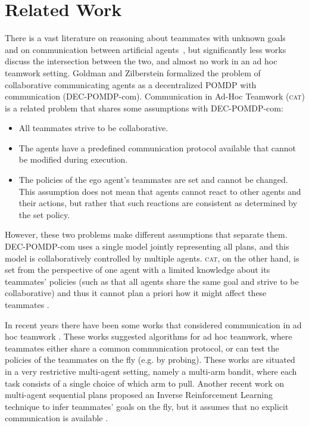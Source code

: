 \documentclass[letterpaper]{article}
\begin{document}
\section{Related Work}
There is a vast literature on reasoning about teammates with unknown goals~\cite{fern2007decision,albrecht2018autonomous} and on communication between artificial agents~\cite{cohen1997team,decker1987distributed,pynadath2002communicative}, but significantly less works discuss the intersection between the two, and almost no work in an ad hoc teamwork setting.
Goldman and Zilberstein  formalized the problem of collaborative communicating agents as a decentralized POMDP with communication (DEC-POMDP-com).
Communication in Ad-Hoc Teamwork (\textsc{cat}) is a related problem that shares some assumptions with DEC-POMDP-com:
\begin{itemize}
\item All teammates strive to be collaborative.
\item The agents have a predefined communication protocol available that cannot be modified during execution.
\item The policies of the ego agent's teammates are set and cannot be changed.  This assumption does not mean that agents cannot react to other agents and their actions, but rather that such reactions are consistent as determined by the set policy.
\end{itemize}
However, these two problems make different assumptions that separate them. DEC-POMDP-com uses a single model jointly representing all plans, and this model is collaboratively controlled by multiple agents. \textsc{cat}, on the other hand, is set from the perspective of one agent with a limited knowledge about its teammates' policies (such as that all agents share the same goal and strive to be collaborative) and thus it cannot plan a priori how it might affect these teammates \cite{stone2013teaching,ravula2019ad}.

In recent years there have been some works that considered communication in ad hoc teamwork \cite{barrett2014communicating,chakraborty2017coordinated}.
These works suggested algorithms for ad hoc teamwork, where teammates either share a common communication protocol, or can test the policies of the teammates on the fly (e.g. by probing).
These works are situated in a very restrictive multi-agent setting, namely a multi-arm bandit, where each task consists of a single choice of which arm to pull. Another recent work on multi-agent sequential plans proposed an Inverse Reinforcement Learning technique to infer teammates' goals on the fly, but it assumes that no explicit communication is available \cite{wang2020too}.
\end{document}
